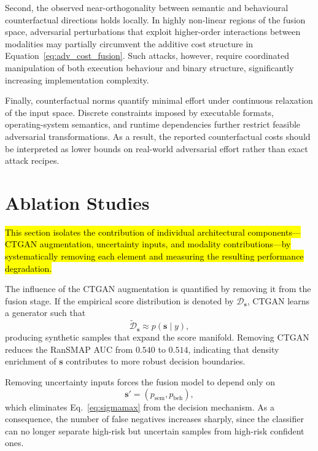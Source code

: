 \documentclass[3p]{elsarticle}
\begin{document}
Second, the observed near-orthogonality between semantic and behavioural counterfactual directions holds locally. In highly non-linear regions of the fusion space, adversarial perturbations that exploit higher-order interactions between modalities may partially circumvent the additive cost
structure in Equation~\eqref{eq:adv_cost_fusion}. Such attacks, however, require coordinated manipulation of both execution behaviour and binary structure, significantly increasing implementation complexity.

Finally, counterfactual norms quantify minimal effort under continuous relaxation of the input space. Discrete constraints imposed by executable formats, operating-system semantics, and runtime dependencies further restrict feasible adversarial transformations. As a result, the reported counterfactual costs should be interpreted as lower bounds on real-world adversarial effort rather than exact attack recipes.

\section{Ablation Studies}
\label{sec:ablation}

\hl{This section isolates the contribution of individual architectural components---CTGAN
augmentation, uncertainty inputs, and modality contributions---by systematically removing
each element and measuring the resulting performance degradation.}

The influence of the CTGAN augmentation is quantified by removing it from the fusion stage. If the empirical score distribution is denoted by \(\mathcal{D}_{\mathbf{s}}\), CTGAN learns a generator such that
\begin{equation}
\tilde{\mathcal{D}}_{\mathbf{s}} \approx p(\mathbf{s} \mid y),
\label{eq:ctgan_dist}
\end{equation}
producing synthetic samples that expand the score manifold. Removing CTGAN reduces the RanSMAP AUC from \(0.540\) to \(0.514\), indicating that density enrichment of \(\mathbf{s}\) contributes to more robust decision boundaries.

Removing uncertainty inputs forces the fusion model to depend only on  
\begin{equation}
\mathbf{s}' = (p_{\mathrm{sem}}, p_{\mathrm{beh}}),
\label{eq:scorevector_reduced}
\end{equation}
which eliminates Eq.~\eqref{eq:sigmamax} from the decision mechanism. As a consequence, the number of false negatives increases sharply, since the classifier can no longer separate high-risk but uncertain samples from high-risk confident ones.
\end{document}
